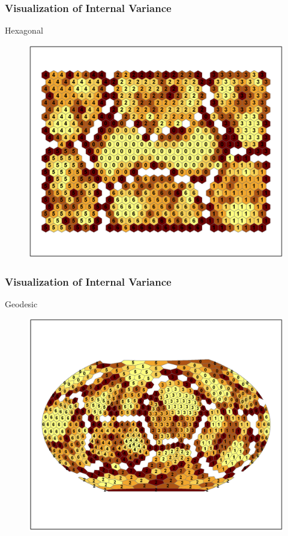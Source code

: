 \documentclass[nototal,handout]{beamer}
\begin{document}
\begin{frame}
	\frametitle{Visualization of Internal Variance}
 
\begin{block}{Hexagonal}
  \begin{center}
  \begin{figure}
  \includegraphics[width=0.70\linewidth]{hex_clusters.png}
  \end{figure}
  \end{center}
 \end{block} \end{frame} 

\begin{frame}
	\frametitle{Visualization of Internal Variance}
 
\begin{block}{Geodesic}
  \begin{center}
  \begin{figure}
  \includegraphics[width=0.70\linewidth]{geodesic_clusters.png}
  \end{figure}
  \end{center}
 \end{block} \end{frame} 
\end{document}
